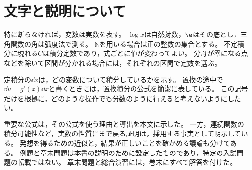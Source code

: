 \section*{文字と説明について}
特に断らなければ，変数は実数を表す。
$\log x$は自然対数，$\e$はその底とし，三角関数の角は弧度法で測る。
$\mathbb{N}$を用いる場合は正の整数の集合とする。
不定積分に現れる$C$は積分定数であり，式ごとに値が変わってよい。
分母が零になる点などを除いて区間が分かれる場合には，それぞれの区間で定数を選ぶ。

定積分の$\dd x$は，どの変数について積分しているかを示す。
置換の途中で$\dd u=g'(x)\dd x$と書くときには，置換積分の公式を簡潔に表している。
この記号だけを根拠に，どのような操作でも分数のように行えると考えないようにしたい。

重要な公式は，その公式を使う理由と導出を本文に示した。
一方，連続関数の積分可能性など，実数の性質にまで戻る証明は，採用する事実として明示している。
発想を得るための近似と，結果が正しいことを確かめる議論も分けてある。
例題と章末問題は本書の説明のために設定したものであり，特定の入試問題の転載ではない。
章末問題と総合演習には，巻末にすべて解答を付けた。

